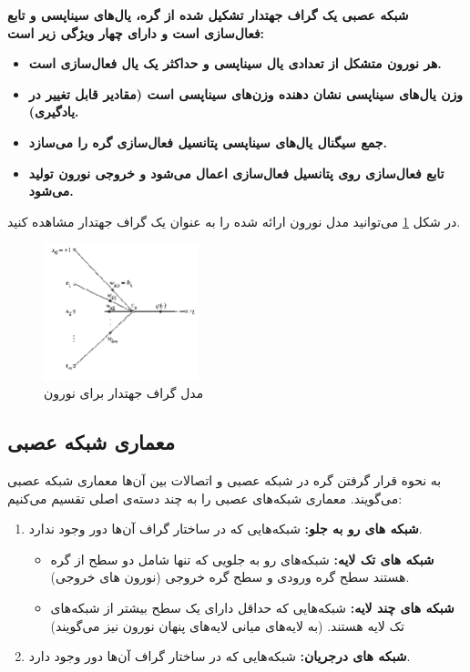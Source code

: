 \documentclass[11pt,a4paper,twocolumn]{article}
\begin{document}
\textbf{
شبکه عصبی یک گراف جهتدار تشکیل شده از گره، یال‌های سیناپسی و تابع فعال‌سازی است و دارای چهار ویژگی زیر است:
}
\begin{itemize}
\item\textbf{
هر نورون متشکل از تعدادی یال سیناپسی و حداکثر یک یال فعال‌سازی است.}
\item\textbf{
وزن یال‌های سیناپسی نشان دهنده وزن‌های سیناپسی است (مقادیر قابل تغییر در یادگیری).}
\item\textbf{
جمع سیگنال یال‌های سیناپسی پتانسیل فعال‌سازی گره را می‌سازد.}
\item\textbf{
تابع فعال‌سازی روی پتانسیل فعال‌سازی اعمال می‌شود و خروجی نورون تولید می‌شود.}
\end{itemize}
در شکل
\ref{fig:neuron-graph}
می‌توانید مدل نورون ارائه شده را به عنوان یک گراف جهتدار مشاهده کنید.
\begin{figure}
  \centering
    \includegraphics[width=0.4\textwidth]{neuron-graph.png}
  \caption{مدل گراف جهتدار برای نورون \cite{haykin}}
  \label{fig:neuron-graph}
\end{figure}

\subsection{معماری شبکه عصبی}
به نحوه قرار گرفتن گره در شبکه عصبی و اتصالات بین آن‌ها معماری شبکه عصبی می‌گویند. معماری شبکه‌های عصبی را به چند دسته‌ی اصلی تقسیم می‌کنیم:

\begin{enumerate}
\item
\textbf{شبکه های رو به جلو:}
شبکه‌هایی که در ساختار گراف آن‌ها دور وجود ندارد. 
\begin{itemize}
\item
\textbf{شبکه های تک لایه:}
شبکه‌های رو به جلویی که تنها شامل دو سطح از گره هستند سطح گره ورودی و سطح گره خروجی (نورون های خروجی).
\item
\textbf{شبکه های چند لایه:}
شبکه‌هایی که حداقل دارای یک سطح بیشتر از شبکه‌های تک لایه هستند. (به لایه‌های میانی لایه‌های پنهان نورون نیز می‌گویند)
\end{itemize}
\item
\textbf{شبکه های درجریان:}
شبکه‌هایی که در ساختار گراف آن‌ها دور وجود دارد.
\end{enumerate}
\end{document}
